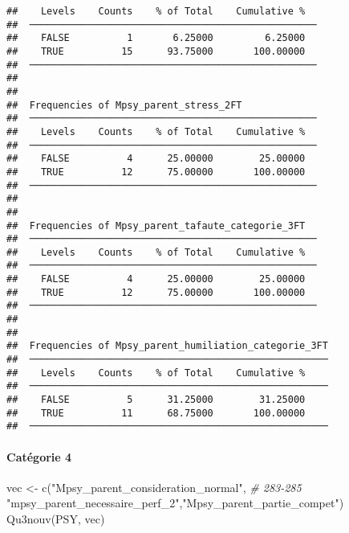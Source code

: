 \documentclass[
]{article}
\newenvironment{Shaded}{\begin{snugshade}}{\end{snugshade}}
\newcommand{\CommentTok}[1]{\textcolor[rgb]{0.56,0.35,0.01}{\textit{#1}}}
\newcommand{\FunctionTok}[1]{\textcolor[rgb]{0.00,0.00,0.00}{#1}}
\newcommand{\NormalTok}[1]{#1}
\newcommand{\OtherTok}[1]{\textcolor[rgb]{0.56,0.35,0.01}{#1}}
\newcommand{\StringTok}[1]{\textcolor[rgb]{0.31,0.60,0.02}{#1}}
\begin{document}
\begin{verbatim}
##    Levels    Counts    % of Total    Cumulative %   
##  ────────────────────────────────────────────────── 
##    FALSE          1       6.25000         6.25000   
##    TRUE          15      93.75000       100.00000   
##  ────────────────────────────────────────────────── 
## 
## 
##  Frequencies of Mpsy_parent_stress_2FT              
##  ────────────────────────────────────────────────── 
##    Levels    Counts    % of Total    Cumulative %   
##  ────────────────────────────────────────────────── 
##    FALSE          4      25.00000        25.00000   
##    TRUE          12      75.00000       100.00000   
##  ────────────────────────────────────────────────── 
## 
## 
##  Frequencies of Mpsy_parent_tafaute_categorie_3FT   
##  ────────────────────────────────────────────────── 
##    Levels    Counts    % of Total    Cumulative %   
##  ────────────────────────────────────────────────── 
##    FALSE          4      25.00000        25.00000   
##    TRUE          12      75.00000       100.00000   
##  ────────────────────────────────────────────────── 
## 
## 
##  Frequencies of Mpsy_parent_humiliation_categorie_3FT 
##  ──────────────────────────────────────────────────── 
##    Levels    Counts    % of Total    Cumulative %   
##  ──────────────────────────────────────────────────── 
##    FALSE          5      31.25000        31.25000   
##    TRUE          11      68.75000       100.00000   
##  ────────────────────────────────────────────────────
\end{verbatim}

\hypertarget{catuxe9gorie-4-2}{%
\paragraph{Catégorie 4}\label{catuxe9gorie-4-2}}

\begin{Shaded}
\begin{Highlighting}[]
\NormalTok{vec }\OtherTok{\textless{}{-}} \FunctionTok{c}\NormalTok{(}\StringTok{"Mpsy\_parent\_consideration\_normal"}\NormalTok{,   }\CommentTok{\# 283{-}285}
         \StringTok{"mpsy\_parent\_necessaire\_perf\_2"}\NormalTok{,}\StringTok{"Mpsy\_parent\_partie\_compet"}\NormalTok{)}
\FunctionTok{Qu3nouv}\NormalTok{(PSY, vec)}
\end{Highlighting}
\end{Shaded}
\end{document}
